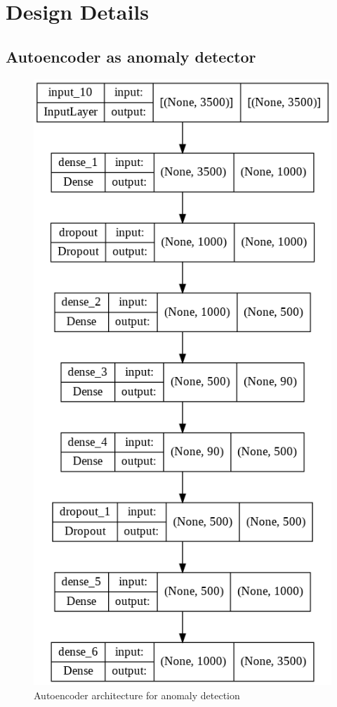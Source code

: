 


    \chapter{Design Details}
    \section{Autoencoder as anomaly detector}  
     \begin{figure}[h]
     	\centering
     	\includegraphics[width=0.39\linewidth]{images/aaut.png}
     	\caption{Autoencoder architecture for anomaly detection }
     	\label{ne11}
     \end{figure}
    
